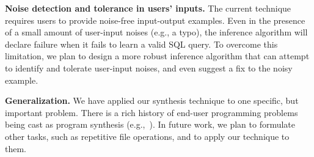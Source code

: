 \textbf{Noise detection and tolerance in users' inputs.} The current technique
requires users to provide noise-free input-output examples.
Even in the presence of a small amount of user-input noises (e.g., a typo),
the inference algorithm will declare failure when it fails to learn
a valid SQL query.
To overcome this limitation, we plan to design a more robust inference
algorithm that can attempt to identify and tolerate user-input noises,
and even suggest a fix to the noisy example.



\textbf{Generalization.}
We have applied our synthesis technique to one specific, but
important problem.  There is a rich history of end-user programming
problems being cast as program synthesis (e.g.,~\cite{Gulwani:2010:DPS}).  In future
work, we plan to formulate other tasks, such as repetitive file operations, and to apply our technique to them.

